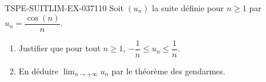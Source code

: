 \begin{exercice}{TSPE-SUITLIM-EX-037}{1}{10}
Soit $(u_n)$ la suite définie pour $n \geq 1$ par $u_n = \dfrac{\cos(n)}{n}$.
\begin{enumerate}
  \item Justifier que pour tout $n \geq 1$, $-\dfrac{1}{n} \leq u_n \leq \dfrac{1}{n}$.
  \item En déduire $\lim_{n \to +\infty} u_n$ par le théorème des gendarmes.
\end{enumerate}
\end{exercice}
